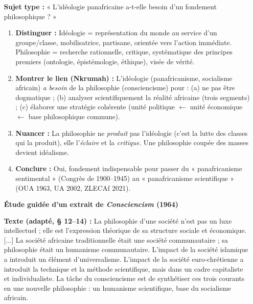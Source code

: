 \documentclass[11pt]{article}
\begin{document}
\begin{methode}
\textbf{Sujet type :} « L'idéologie panafricaine a-t-elle besoin d'un fondement philosophique ? »
\begin{enumerate}
    \item \textbf{Distinguer :} Idéologie = représentation du monde au service d'un groupe/classe, mobilisatrice, partisane, orientée vers l'action immédiate. Philosophie = recherche rationnelle, critique, systématique des principes premiers (ontologie, épistémologie, éthique), visée de vérité.
    \item \textbf{Montrer le lien (Nkrumah) :} L'idéologie (panafricanisme, socialisme africain) \emph{a besoin} de la philosophie (consciencisme) pour : (a) ne pas être dogmatique ; (b) analyser scientifiquement la réalité africaine (trois segments) ; (c) élaborer une stratégie cohérente (unité politique $\leftarrow$ unité économique $\leftarrow$ base philosophique commune).
    \item \textbf{Nuancer :} La philosophie ne \emph{produit} pas l'idéologie (c'est la lutte des classes qui la produit), elle l'\emph{éclaire} et la \emph{critique}. Une philosophie coupée des masses devient idéalisme.
    \item \textbf{Conclure :} Oui, fondement indispensable pour passer du « panafricanisme sentimental » (Congrès de 1900--1945) au « panafricanisme scientifique » (OUA 1963, UA 2002, ZLECAf 2021).
\end{enumerate}
\end{methode}

\textbf{Étude guidée d'un extrait de \emph{Consciencism} (1964)}\par

\textbf{Texte (adapté, § 12--14) :}
\og La philosophie d'une société n'est pas un luxe intellectuel ; elle est l'expression théorique de sa structure sociale et économique. [...] La société africaine traditionnelle était une société communautaire ; sa philosophie était un humanisme communautaire. L'impact de la société islamique a introduit un élément d'universalisme. L'impact de la société euro-chrétienne a introduit la technique et la méthode scientifique, mais dans un cadre capitaliste et individualiste. La tâche du consciencisme est de synthétiser ces trois courants en une nouvelle philosophie : un humanisme scientifique, base du socialisme africain. \fg
\end{document}
